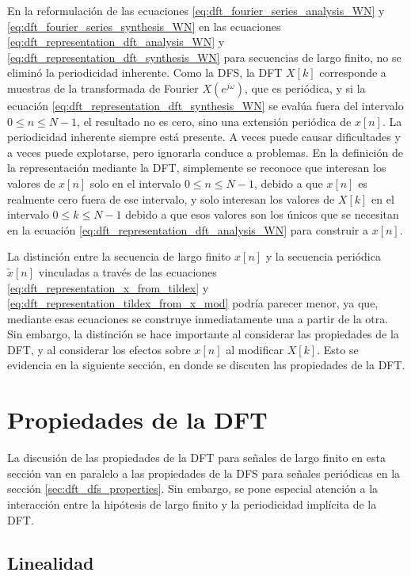 \documentclass[a4paper]{report}
\begin{document}
En la reformulación de las ecuaciones \ref{eq:dft_fourier_series_analysis_WN} y \ref{eq:dft_fourier_series_synthesis_WN} en las ecuaciones \ref{eq:dft_representation_dft_analysis_WN} y \ref{eq:dft_representation_dft_synthesis_WN} para secuencias de largo finito, no se eliminó la periodicidad inherente. Como la DFS, la DFT \(X[k]\) corresponde a muestras de la transformada de Fourier \(X(e^{j\omega})\), que es periódica, y si la ecuación \ref{eq:dft_representation_dft_synthesis_WN} se evalúa fuera del intervalo \(0\leq n\leq N-1\), el resultado no es cero, sino una extensión periódica de \(x[n]\). La periodicidad inherente siempre está presente. A veces puede causar dificultades y a veces puede explotarse, pero ignorarla conduce a problemas. En la definición de la representación mediante la DFT, simplemente se reconoce que interesan los valores de \(x[n]\) solo en el intervalo \(0\leq n\leq N-1\), debido a que \(x[n]\) es realmente cero fuera de ese intervalo, y solo interesan los valores de \(X[k]\) en el intervalo \(0\leq k\leq N-1\) debido a que esos valores son los únicos que se necesitan en la ecuación \ref{eq:dft_representation_dft_analysis_WN} para construir a \(x[n]\). 

La distinción entre la secuencia de largo finito \(x[n]\) y la secuencia periódica \(\tilde{x}[n]\) vinculadas a través de las ecuaciones \ref{eq:dft_representation_x_from_tildex} y \ref{eq:dft_representation_tildex_from_x_mod} podría parecer menor, ya que, mediante esas ecuaciones se construye inmediatamente una a partir de la otra. Sin embargo, la distinción se hace importante al considerar las propiedades de la DFT, y al considerar los efectos sobre \(x[n]\) al modificar \(X[k]\). Esto se evidencia en la siguiente sección, en donde se discuten las propiedades de la DFT. 

\section{Propiedades de la DFT}

La discusión de las propiedades de la DFT para señales de largo finito en esta sección van en paralelo a las propiedades de la DFS para señales periódicas en la sección \ref{sec:dft_dfs_properties}. Sin embargo, se pone especial atención a la interacción entre la hipótesis de largo finito y la periodicidad implícita de la DFT.

\subsection{Linealidad}
\end{document}

